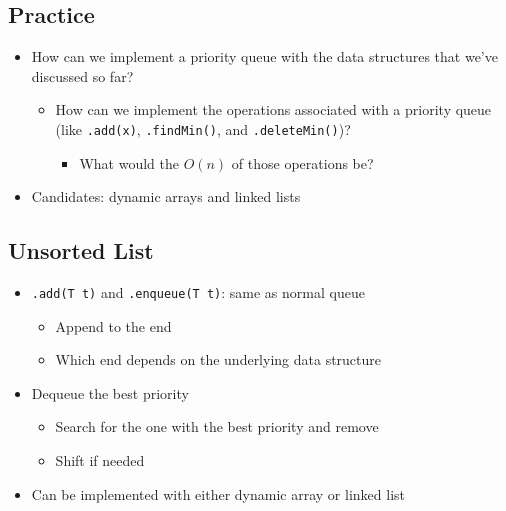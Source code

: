 \documentclass[10pt]{article}
\begin{document}
\subsection*{Practice}
\begin{itemize}
    \item How can we implement a priority queue with the data structures that we've discussed so far?
    \begin{itemize}
        \item How can we implement the operations associated with a priority queue (like \texttt{.add(x)}, \texttt{.findMin()}, and \texttt{.deleteMin()})?
        \begin{itemize}
            \item What would the $O(n)$ of those operations be?
        \end{itemize}
    \end{itemize}
    \item Candidates: dynamic arrays and linked lists
\end{itemize}


\subsection*{Unsorted List}
\begin{itemize}
    \item \texttt{.add(T t)} and \texttt{.enqueue(T t)}: same as normal queue
    \begin{itemize}
        \item Append to the end
        \item Which end depends on the underlying data structure
    \end{itemize}
    \item Dequeue the best priority
    \begin{itemize}
        \item Search for the one with the best priority and remove
        \item Shift if needed
    \end{itemize}
    \item Can be implemented with either dynamic array or linked list
\end{itemize}
\end{document}
